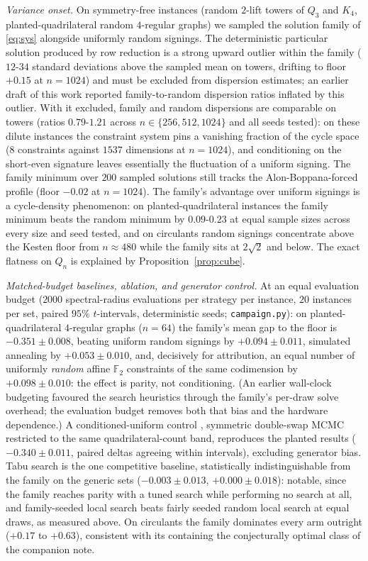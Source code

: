 \documentclass[11pt]{article}
\theoremstyle{remark}
\begin{document}
\emph{Variance onset.} On symmetry-free instances (random $2$-lift
towers of $Q_3$ and $K_4$, planted-quadrilateral random $4$-regular
graphs) we sampled the solution family of \eqref{eq:sys} alongside
uniformly random signings. The deterministic particular solution
produced by row reduction is a strong upward outlier within the family
($12$-$34$ standard deviations above the sampled mean on towers,
drifting to floor $+0.15$ at $n=1024$) and must be excluded from
dispersion estimates; an earlier draft of this work reported
family-to-random dispersion ratios inflated by this outlier. With it
excluded, family and random dispersions are comparable on towers
(ratios $0.79$-$1.21$ across $n\in\{256,512,1024\}$ and all seeds
tested): on these dilute instances the constraint system pins a
vanishing fraction of the cycle space ($8$ constraints against $1537$
dimensions at $n=1024$), and conditioning on the short-even signature
leaves essentially the fluctuation of a uniform signing. The family
minimum over $200$ sampled solutions still tracks the
Alon-Boppana-forced profile (floor $-0.02$ at $n=1024$). The family's
advantage over uniform signings is a cycle-density phenomenon: on
planted-quadrilateral instances the family minimum beats the random
minimum by $0.09$-$0.23$ at equal sample sizes across every size and
seed tested, and on circulants random signings concentrate above the
Kesten floor from $n\approx480$ while the family sits at $2\sqrt2$ and
below. The exact flatness on
$Q_n$ is explained by Proposition~\ref{prop:cube}.

\emph{Matched-budget baselines, ablation, and generator control.} At
an equal evaluation budget ($2000$ spectral-radius evaluations per
strategy per instance, $20$ instances per set, paired $95\%$
$t$-intervals, deterministic seeds; \texttt{campaign.py}): on
planted-quadrilateral $4$-regular graphs ($n=64$) the family's mean gap
to the floor is $-0.351\pm0.008$, beating uniform random signings by
$+0.094\pm0.011$, simulated annealing by $+0.053\pm0.010$, and,
decisively for attribution, an equal number of uniformly
\emph{random} affine $\mathbb F_2$ constraints of the same codimension
by $+0.098\pm0.010$: the effect is parity, not conditioning. (An
earlier wall-clock budgeting favoured the search heuristics through the
family's per-draw solve overhead; the evaluation budget removes both
that bias and the hardware dependence.) A conditioned-uniform control
, symmetric double-swap MCMC restricted to the same
quadrilateral-count band, reproduces the planted results
($-0.340\pm0.011$, paired deltas agreeing within intervals), excluding
generator bias. Tabu search is the one competitive baseline,
statistically indistinguishable from the family on the generic sets
($-0.003\pm0.013$, $+0.000\pm0.018$): notable, since the family reaches
parity with a tuned search while performing no search at all, and
family-seeded local search beats fairly seeded random local search at
equal draws, as measured above. On circulants the family dominates
every arm outright ($+0.17$ to $+0.63$), consistent with its containing
the conjecturally optimal class of the companion note.
\end{document}
